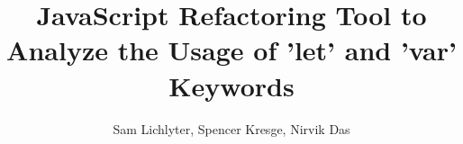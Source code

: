 \documentclass{sig-alternate}
\begin{document}






%

\title{JavaScript Refactoring Tool to Analyze the Usage of 'let' and 'var' Keywords}
%
%
%
%
%

%
\author{
%
%
Sam Lichlyter, Spencer Kresge, Nirvik Das\\
\\
\\
}
\end{document}
